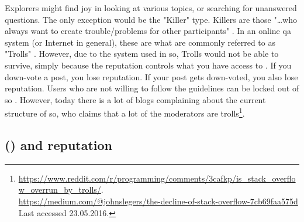 Explorers might find joy in looking at various topics, or searching for unanswered questions.
The only exception would be the "Killer" type. 
Killers are those "\ldots who always want to create trouble/problems for other participants" \cite[p.~3]{Maan2013}. 
In an online \gls{qa} system (or Internet in general), these are what are commonly referred to as "Trolls" \cite{Fosdick2012, Atwood2015}. 
However, due to the system used in \gls{so}, Trolls would not be able to survive, simply because the reputation controls what you have access to \cite{StackOverflow.com2016g}. 
If you down-vote a post, you lose reputation. 
If your post gets down-voted, you also lose reputation. 
Users who are not willing to follow the guidelines can be locked out of \gls{so} \cite{Atwood2009}.
However, today there is a lot of blogs complaining about the current structure of \gls{so}, who claims that a lot of the moderators are
trolls\footnote{\url{https://www.reddit.com/r/programming/comments/3cafkp/is_stack_overflow_overrun_by_trolls/}. \\	
	\url{https://medium.com/@johnslegers/the-decline-of-stack-overflow-7cb69faa575d} \\ 
	Last accessed 23.05.2016. 
}.

\subsection[Stack Overflow and reputation]{ () and reputation}
\label{sec:research_on_so}

